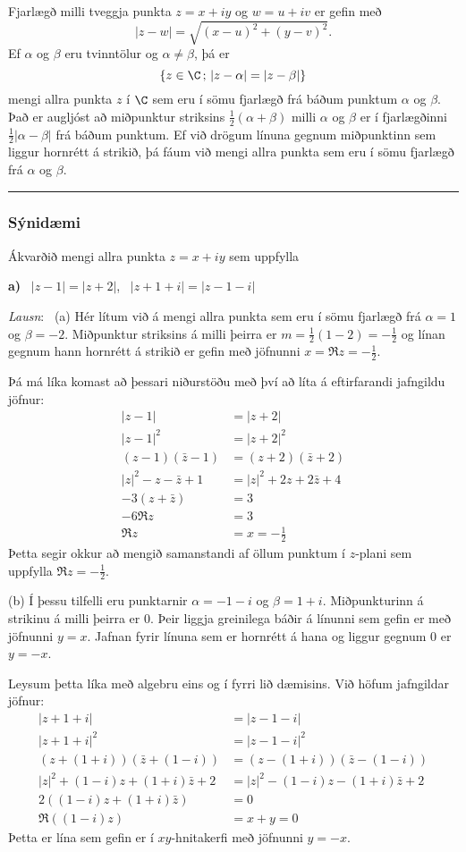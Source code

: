 Fjarlægð milli tveggja punkta $z=x+iy$ og $w=u+iv$ er gefin með
$$
|z-w|=\sqrt{(x-u)^2+(y-v)^2}.
$$
Ef $\alpha$ og $\beta$ eru tvinntölur og $\alpha\neq
\beta$, þá er 
$$\{z\in \C\,;\, |z-\alpha|=|z-\beta|\}
$$ mengi allra punkta
$z$ í $\C$ sem eru í sömu fjarlægð frá báðum punktum $\alpha$ og
$\beta$.  Það er augljóst að miðpunktur striksins $\frac
12(\alpha+\beta)$ milli $\alpha$ og $\beta$ er í fjarlægðinni
$\frac 12|\alpha-\beta|$ frá báðum punktum.  Ef við drögum línuna 
gegnum miðpunktinn sem
liggur hornrétt á strikið, þá fáum við mengi allra punkta sem eru í
sömu fjarlægð frá $\alpha$ og $\beta$.

\bigskip\hrule\bigskip

\subsubsection{Sýnidæmi}  Ákvarðið mengi allra punkta $z=x+iy$ sem uppfylla

\smallskip
{\bf a)} \ $|z-1|=|z+2|$,  \ $|z+1+i|=|z-1-i|$


\medskip
{\it Lausn}: \ (a) Hér lítum við á mengi allra punkta 
sem eru í sömu fjarlægð frá $\alpha=1$ og $\beta=-2$.  Miðpunktur
striksins á milli þeirra er $m=\tfrac 12(1-2)=-\tfrac 12$ og línan
gegnum hann hornrétt á strikið er gefin með jöfnunni $x=\Re z=-\tfrac
12$.


Þá má líka komast að þessari niðurstöðu með því að líta á
eftirfarandi jafngildu jöfnur:
\begin{align*}
|z-1|&=|z+2| \\
|z-1|^2&=|z+2|^2 \\
(z-1)(\bar z-1)&=(z+2)(\bar z+2) \\
|z|^2-z-\bar z+1&=|z|^2+2z+2\bar z+4\\
-3(z+\bar z)&=3\\
-6\Re z&=3\\
\Re z&=x=-\tfrac 12
\end{align*} 
Þetta segir okkur að mengið samanstandi  af öllum punktum 
í $z$-plani sem uppfylla $\Re z=-\tfrac 12$.

\smallskip\noindent
(b) Í þessu tilfelli eru punktarnir $\alpha=-1-i$ og $\beta=1+i$.
Miðpunkturinn á strikinu á milli þeirra er $0$.  Þeir liggja
greinilega báðir á línunni sem gefin er með jöfnunni $y=x$. Jafnan
fyrir línuna sem er hornrétt á hana og liggur gegnum $0$ er
$y=-x$.

Leysum þetta líka með algebru eins og í fyrri lið dæmisins.
Við höfum jafngildar jöfnur:
\begin{align*}
|z+1+i|&=|z-1-i| \\
|z+1+i|^2&=|z-1-i|^2 \\
(z+(1+i))(\bar z+(1-i))&=(z-(1+i))(\bar
z-(1-i)) \\
|z|^2+(1-i)z+(1+i)\bar z+2&=|z|^2-(1-i)z-(1+i)\bar z+2\\
2((1-i)z+(1+i)\bar z)&=0\\
\Re ((1-i)z)&=x+y=0
\end{align*} 
Þetta er lína sem gefin er í $xy$-hnitakerfi með jöfnunni
$y=-x$.


